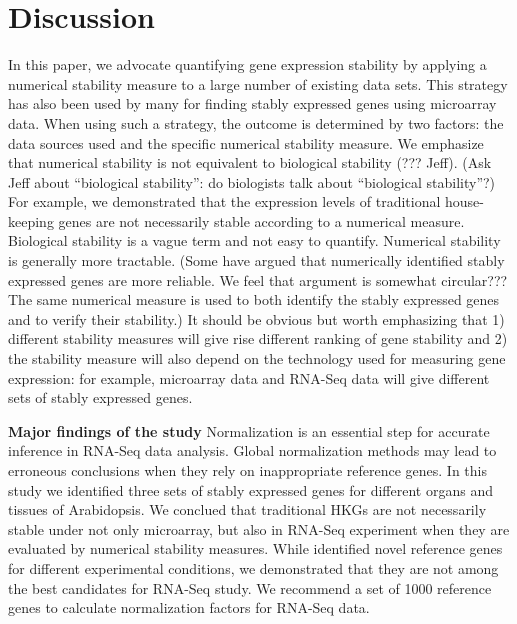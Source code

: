 \documentclass[11pt, a4paper]{article}
\begin{document}
  \section{Discussion}
In this paper, we advocate quantifying gene expression stability by applying a
numerical stability measure to a large number of existing data sets.  This
strategy has also been used by many for finding stably expressed genes using
microarray data.  When using such a strategy, the outcome is determined by two
factors: the data sources used and the specific numerical stability measure.
We emphasize that numerical stability is not equivalent to biological
stability (??? Jeff).  (Ask Jeff about  ``biological stability'': do
biologists talk about ``biological stability''?) For example, we demonstrated
that the expression levels of traditional house-keeping genes are not
necessarily stable according to a numerical measure. 
Biological stability is a vague term and not easy to quantify.  Numerical
stability is generally more tractable. (Some have argued that numerically
identified stably expressed genes are more reliable. We feel that argument is
somewhat circular??? The same numerical measure is used to both identify the
stably expressed genes and to verify their stability.) It should be obvious
but worth emphasizing that 1) different stability measures will give rise
different ranking of gene stability and 2) the stability measure will also
depend on the technology used for measuring gene expression: for example,
microarray data and RNA-Seq data will give different sets of stably expressed
genes.


  \textbf{Major findings of the study}
  Normalization is an essential step for accurate inference in RNA-Seq data analysis. Global normalization methods may lead to erroneous conclusions when they rely on inappropriate reference genes. In this study we identified three sets of stably expressed genes for different organs and tissues of Arabidopsis. We conclued that traditional HKGs are not necessarily stable under not only microarray, but also in RNA-Seq experiment when they are evaluated by numerical stability measures. While \cite{czechowski2005genome} identified novel reference genes for different experimental conditions, we demonstrated that they are not among the best candidates for RNA-Seq study. We recommend a set of 1000 reference genes to calculate normalization factors for RNA-Seq data.  
   
\end{document}
